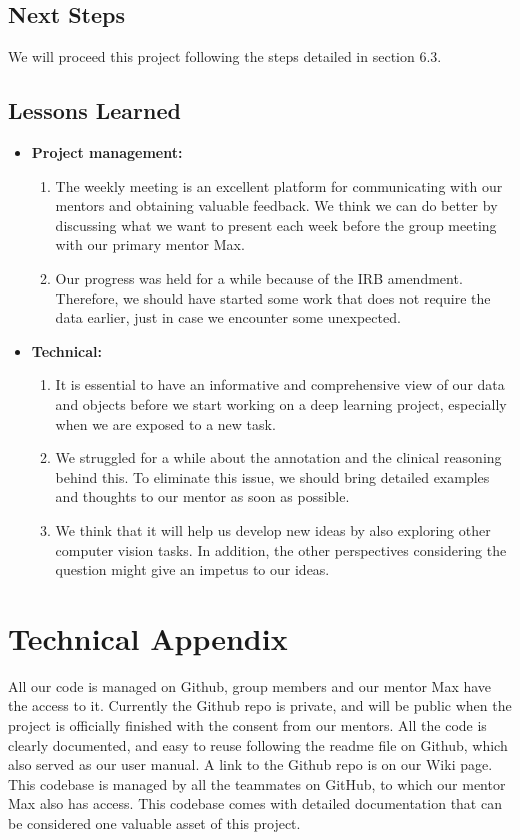 \documentclass[11pt]{article} \usepackage[top=1in, bottom=1in, left=1in, right=1in]{geometry}
\begin{document}
\subsection{Next Steps}
We will proceed this project following the steps detailed in section 6.3.
\subsection{Lessons Learned}
\begin{itemize}
    \item \textbf{Project management:}
    \begin{enumerate}
        \item The weekly meeting is an excellent platform for communicating with our mentors and obtaining valuable feedback. We think we can do better by discussing what we want to present each week before the group meeting with our primary mentor Max.
        \item Our progress was held for a while because of the IRB amendment. Therefore, we should have started some work that does not require the data earlier, just in case we encounter some unexpected. 
    \end{enumerate}
    \item \textbf{Technical:}
    \begin{enumerate}
        \item It is essential to have an informative and comprehensive view of our data and objects before we start working on a deep learning project, especially when we are exposed to a new task.
        \item We struggled for a while about the annotation and the clinical reasoning behind this. To eliminate this issue, we should bring detailed examples and thoughts to our mentor as soon as possible. 
        \item We think that it will help us develop new ideas by also exploring other computer vision tasks. In addition, the other perspectives considering the question might give an impetus to our ideas.
    \end{enumerate}
\end{itemize}
\section{Technical Appendix}
All our code is managed on Github, group members and our mentor Max have the access to it. Currently the Github repo is private, and will be public when the project is officially finished with the consent from our mentors. All the code is clearly documented, and easy to reuse following the readme file on Github, which also served as our user manual. A link to the Github repo is on our Wiki page. This codebase is managed by all the teammates on GitHub, to which our mentor Max also has access. This codebase comes with detailed documentation that can be considered one valuable asset of this project.

\newpage

\end{document}

